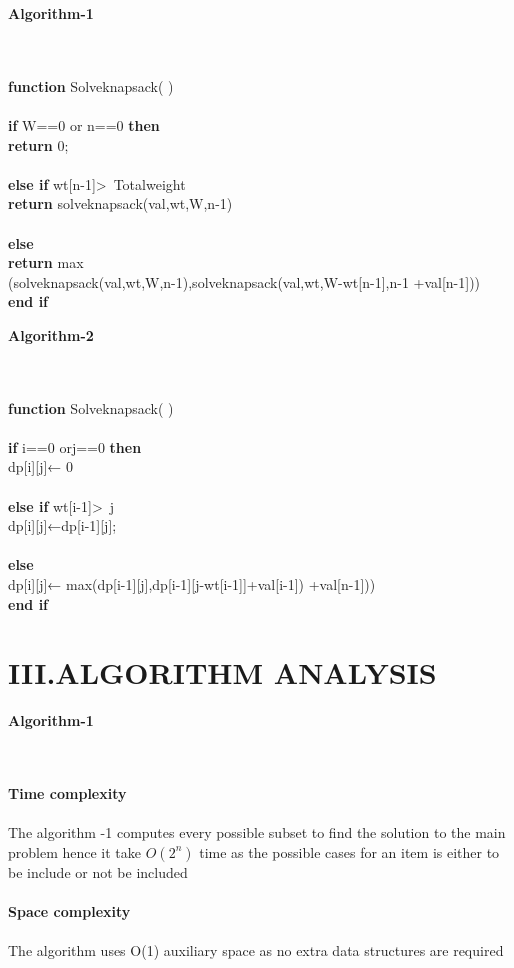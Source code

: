 \documentclass[twocolumn]{article}
\begin{document}
\centerline{\textbf{Algorithm-1}}\\
\vspace{7px}
\hline
\vspace{10px}
\nointend\\
\textbf{function}  Solveknapsack( )\\
\\
   \noindent    \textbf{\qquad if}\: \:W==0 \:or\: n==0\:
	\textbf{then} \\
         \textbf{return }  0;\\
         \\
         \textbf{\qquad else if} wt[n-1]\textgreater \ Totalweight\\
            \textbf{return }  solveknapsack(val,wt,W,n-1)\\
            \\
    \textbf{\qquad else}\\
         \textbf{return } max\\(solveknapsack(val,wt,W,n-1),solveknapsack(val,wt,W-wt[n-1],n-1
+val[n-1]))\\
 \textbf{\qquad end if}
\\
\hline
\vfill\eject
\centerline{\textbf{Algorithm-2}}\\
\vspace{7px}
\hline
\vspace{10px}
\noindent  \\
\textbf{function}  Solveknapsack( )\\
\\
   \noindent    \textbf{\qquad if}\: \:i==0 \:or\:j==0\:
	\textbf{then} \\
         dp[i][j]← 0\\
\noindent  
         \\
         \textbf{\qquad else if} wt[i-1]\textgreater \ j
 \noindent     \\     
           dp[i][j]←dp[i-1][j];\\
            \\
            \noindent  
    \textbf{\qquad else}\\
        dp[i][j]← max(dp[i-1][j],dp[i-1][j-wt[i-1]]+val[i-1])
+val[n-1]))\\
 \textbf{\qquad end if}

 \vspace{10px}
 \hline
\section*{III.ALGORITHM ANALYSIS}
\centerline{\textbf{Algorithm-1}}\\
\\
\textbf{Time complexity}\\
\\
The algorithm -1 computes every possible subset to find the solution to the main problem hence it take $O(2^n)$ time as the possible cases for an item is either to be include or not be included \\
\\
\textbf{Space complexity}\\
\\
The algorithm uses O(1) auxiliary space as no extra data structures are required\\
\end{document}
